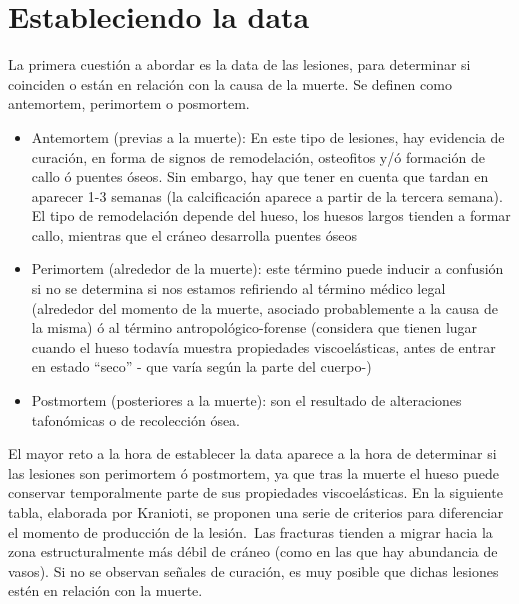 \section{Estableciendo la data}
La primera cuestión a abordar es la data de las lesiones, para determinar si coinciden o están en relación con la causa de la muerte. Se definen como antemortem, perimortem o posmortem.\
\begin{itemize}
	\item Antemortem (previas a la muerte): En este tipo de lesiones, hay evidencia de curación, en forma de signos de remodelación, osteofitos y/ó formación de callo ó puentes óseos. Sin embargo, hay que tener en cuenta que tardan en aparecer 1-3 semanas (la calcificación aparece a partir de la tercera semana).  El tipo de remodelación depende del hueso, los huesos largos tienden a formar callo, mientras que el cráneo desarrolla puentes óseos
	\item Perimortem (alrededor de la muerte): este término puede inducir a confusión si no se determina si nos estamos refiriendo al término médico legal (alrededor del momento de la muerte, asociado probablemente a la causa de la misma) ó al término antropológico-forense (considera que tienen lugar cuando el hueso todavía muestra propiedades viscoelásticas, antes de entrar en estado “seco” - que varía según la parte del cuerpo-)
	\item Postmortem (posteriores a la muerte): son el resultado de alteraciones tafonómicas o de recolección ósea. 
\end{itemize}
El mayor reto a la hora de establecer la data aparece a la hora de determinar si las lesiones son perimortem ó postmortem, ya que tras la muerte el hueso puede conservar temporalmente parte de sus propiedades viscoelásticas. En la siguiente tabla, elaborada por Kranioti, se proponen una serie de criterios para diferenciar el momento de producción de la lesión.\
Las fracturas tienden a migrar hacia la zona estructuralmente más débil de cráneo (como en las que hay abundancia de vasos). Si no se observan señales de curación, es muy posible que dichas lesiones estén en relación con la muerte. 
